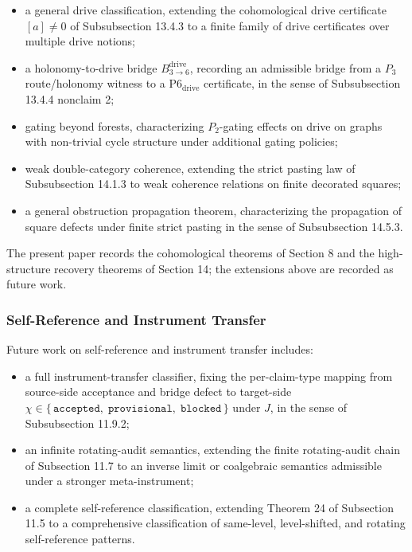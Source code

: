 \documentclass[11pt]{article}
\providecommand{\tightlist}{}
\theoremstyle{definition}
\begin{document}
\begin{itemize}
\tightlist
\item
  a general drive classification, extending the cohomological drive certificate \([a]\neq 0\) of Subsubsection 13.4.3 to a finite family of drive certificates over multiple drive notions;
\item
  a holonomy-to-drive bridge \(B_{3\to 6}^{\mathrm{drive}}\), recording an admissible bridge from a \(P_{3}\) route/holonomy witness to a \(\mathrm{P6}_{\mathrm{drive}}\) certificate, in the sense of Subsubsection 13.4.4 nonclaim 2;
\item
  gating beyond forests, characterizing \(P_{2}\)-gating effects on drive on graphs with non-trivial cycle structure under additional gating policies;
\item
  weak double-category coherence, extending the strict pasting law of Subsubsection 14.1.3 to weak coherence relations on finite decorated squares;
\item
  a general obstruction propagation theorem, characterizing the propagation of square defects under finite strict pasting in the sense of Subsubsection 14.5.3.
\end{itemize}

The present paper records the cohomological theorems of Section 8 and the high-structure recovery theorems of Section 14; the extensions above are recorded as future work.

\subsubsection{Self-Reference and Instrument Transfer}

Future work on self-reference and instrument transfer includes:

\begin{itemize}
\tightlist
\item
  a full instrument-transfer classifier, fixing the per-claim-type mapping from source-side acceptance and bridge defect to target-side \(\chi\in\{\,\texttt{accepted},\;\texttt{provisional},\;\texttt{blocked}\,\}\) under \(J\), in the sense of Subsubsection 11.9.2;
\item
  an infinite rotating-audit semantics, extending the finite rotating-audit chain of Subsection 11.7 to an inverse limit or coalgebraic semantics admissible under a stronger meta-instrument;
\item
  a complete self-reference classification, extending Theorem 24 of Subsection 11.5 to a comprehensive classification of same-level, level-shifted, and rotating self-reference patterns.
\end{itemize}
\end{document}
